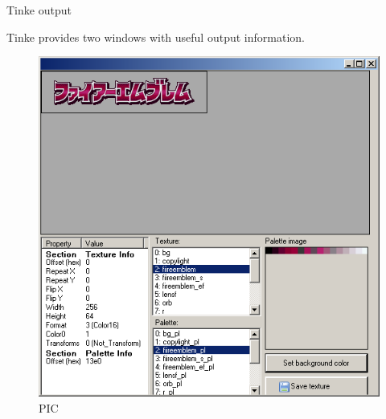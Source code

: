 \documentclass[
]{book}
\begin{document}
Tinke output

Tinke provides two windows with useful output information.

\begin{figure}
\centering
\includegraphics{images/70_home_fast6191_romhackingguide_unrenamed_file___gguidegraphics3dminorNSMBDtexturedecoding_2.png}
\caption{PIC}
\end{figure}
\end{document}
